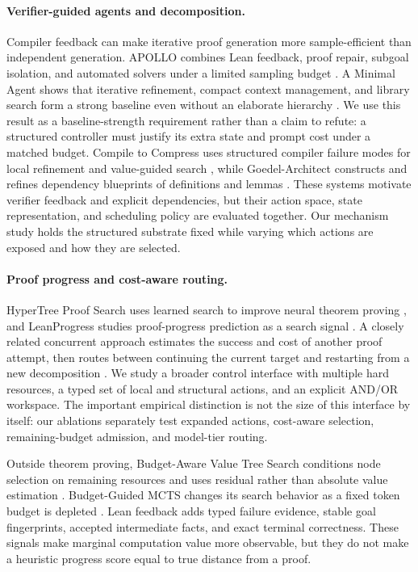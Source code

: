 \paragraph{Verifier-guided agents and decomposition.}
Compiler feedback can make iterative proof generation more sample-efficient
than independent generation. APOLLO combines Lean feedback, proof repair,
subgoal isolation, and automated solvers under a limited sampling budget
\cite{ospanov2025apollo}. A Minimal Agent shows that iterative refinement,
compact context management, and library search form a strong baseline even
without an elaborate hierarchy \cite{requena2026minimal}. We use this result
as a baseline-strength requirement rather than a claim to refute: a structured
controller must justify its extra state and prompt cost under a matched budget.
Compile to Compress uses structured compiler failure modes for local refinement
and value-guided search \cite{li2026compile}, while Goedel-Architect constructs
and refines dependency blueprints of definitions and lemmas
\cite{chung2026architect}. These systems motivate verifier feedback and
explicit dependencies, but their action space, state representation, and
scheduling policy are evaluated together. Our mechanism study holds the
structured substrate fixed while varying which actions are exposed and how
they are selected.

\paragraph{Proof progress and cost-aware routing.}
HyperTree Proof Search uses learned search to improve neural theorem proving
\cite{lample2022hypertree}, and LeanProgress studies proof-progress prediction
as a search signal \cite{george2026leanprogress}. A closely related concurrent
approach estimates the success and cost of another proof attempt, then routes
between continuing the current target and restarting from a new decomposition
\cite{rognvaldsson2026costquality}. We study a broader control interface with
multiple hard resources, a typed set of local and structural actions, and an
explicit AND/OR workspace. The important empirical distinction is not the size
of this interface by itself: our ablations separately test expanded actions,
cost-aware selection, remaining-budget admission, and model-tier routing.

Outside theorem proving, Budget-Aware Value Tree Search conditions node
selection on remaining resources and uses residual rather than absolute value
estimation \cite{li2026bavt}. Budget-Guided MCTS changes its search behavior as
a fixed token budget is depleted \cite{miyamoto2026bgmcts}. Lean feedback adds
typed failure evidence, stable goal fingerprints, accepted intermediate facts,
and exact terminal correctness. These signals make marginal computation value
more observable, but they do not make a heuristic progress score equal to true
distance from a proof.

